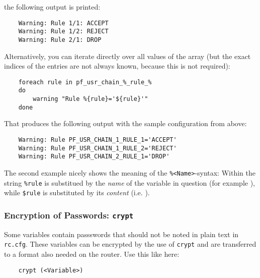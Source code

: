     the following output is printed:

\begin{example}
\begin{verbatim}
    Warning: Rule 1/1: ACCEPT
    Warning: Rule 1/2: REJECT
    Warning: Rule 2/1: DROP
\end{verbatim}
\end{example}

    Alternatively, you can iterate directly over all values of the array
    (but the exact indices of the entries are not always known, because this is not
    required):

\begin{example}
\begin{verbatim}
    foreach rule in pf_usr_chain_%_rule_%
    do
        warning "Rule %{rule}='${rule}'"
    done
\end{verbatim}
\end{example}

    That produces the following output with the sample configuration from above:

\begin{example}
\begin{verbatim}
    Warning: Rule PF_USR_CHAIN_1_RULE_1='ACCEPT'
    Warning: Rule PF_USR_CHAIN_1_RULE_2='REJECT'
    Warning: Rule PF_USR_CHAIN_2_RULE_1='DROP'
\end{verbatim}
\end{example}

    The second example nicely shows the meaning of the
    \texttt{\%{<Name>}}-syntax: Within the string
    \texttt{\%{rule}} is substitued by the \emph{name} of the variable in question
    (for example ), while \texttt{\${rule}}
    is substituted by its \emph{content} (i.e. ).

\subsubsection{Encryption of Passwords: \texttt{crypt}}

Some variables contain passswords that should not be noted in plain text in
\texttt{rc.cfg}. These variables can be encrypted by the use of \texttt{crypt}
and are transferred to a format also needed on the router. Use this like here:

\begin{example}
\begin{verbatim}
    crypt (<Variable>)
\end{verbatim}
\end{example}

